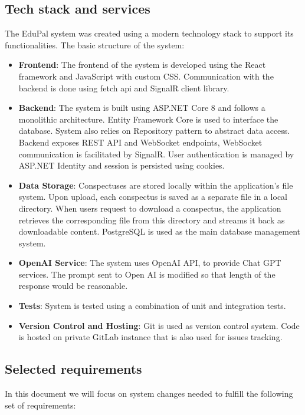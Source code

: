 \documentclass[
    english, %
]{VUMIFPSkursinis}
\begin{document}
\subsection{Tech stack and services}

The EduPal system was created using a modern technology stack to support its functionalities. The basic structure of the system:

\begin{itemize}
    \item \textbf{Frontend}: The frontend of the system is developed using the React framework and JavaScript with custom CSS. Communication with the backend is done using fetch api and SignalR client library.
    \item \textbf{Backend}: The system is built using ASP.NET Core 8 and follows a monolithic architecture. Entity Framework Core is used to interface the database. System also relies on Repository pattern to abstract data access. Backend exposes REST API and WebSocket endpoints, WebSocket communication is facilitated by SignalR. User authentication is managed by ASP.NET Identity and session is persisted using cookies.
          \item\textbf{Data Storage}: Conspectuses are stored locally within the application's file system. Upon upload, each conspectus is saved as a separate file in a local directory. When users request to download a conspectus, the application retrieves the corresponding file from this directory and streams it back as downloadable content. PostgreSQL is used as the main database management system.
    \item \textbf{OpenAI Service}: The system uses OpenAI API, to provide Chat GPT services. The prompt sent to Open AI is modified so that length of the response would be reasonable.
    \item \textbf{Tests}: System is tested using a combination of unit and integration tests.
    \item \textbf{Version Control and Hosting}: Git is used as version control system. Code is hosted on private GitLab instance that is also used for issues tracking.
\end{itemize}

\subsection{Selected requirements}
In this document we will focus on system changes needed to fulfill the following set of requirements:
\end{document}
